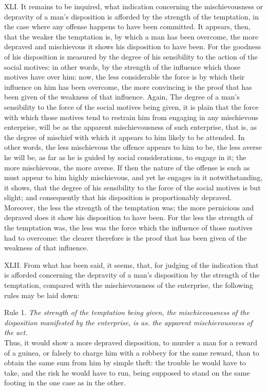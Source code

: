 \documentclass[12pt]{report}
\begin{document}
XLI. It remains to be inquired, what indication concerning the
mischievousness or depravity of a man's disposition is afforded by the
strength of the temptation, in the case where any offense happens to
have been committed. It appears, then, that the weaker the temptation
is, by which a man has been overcome, the more depraved and mischievous
it shows his disposition to have been. For the goodness of his
disposition is measured by the degree of his sensibility to the action
of the social motives: in other words, by the strength of the influence
which those motives have over him: now, the less considerable the force
is by which their influence on him has been overcome, the more
convincing is the proof that has been given of the weakness of that
influence. Again, The degree of a man's sensibility to the force of the
social motives being given, it is plain that the force with which those
motives tend to restrain him from engaging in any mischievous
enterprise, will be as the apparent mischievousness of such enterprise,
that is, as the degree of mischief with which it appears to him likely
to be attended. In other words, the less mischievous the offence appears
to him to be, the less averse he will be, as far as he is guided by
social considerations, to engage in it; the more mischievous, the more
averse. If then the nature of the offense is such as must appear to him
highly mischievous, and yet he engages in it notwithstanding, it shows,
that the degree of his sensibility to the force of the social motives is
but slight; and consequently that his disposition is proportionably
depraved. Moreover, the less the strength of the temptation was; the
more pernicious and depraved does it show his disposition to have been.
For the less the strength of the temptation was, the less was the force
which the influence of those motives had to overcome: the clearer
therefore is the proof that has been given of the weakness of that
influence.

XLII. From what has been said, it seems, that, for judging of the
indication that is afforded concerning the depravity of a man's
disposition by the strength of the temptation, compared with the
mischievousness of the enterprise, the following rules may be laid down:

Rule 1. \emph{The strength of the temptation being given, the
mischievousness} \emph{of the disposition manifested by the enterprise,
is as. the apparent mischievousness of the act.}\\
Thus, it would show a more depraved disposition, to murder a man for a
reward of a guinea, or falsely to charge him with a robbery for the same
reward, than to obtain the same sum from him by simple theft: the
trouble he would have to take, and the risk he would have to run, being
supposed to stand on the same footing in the one case as in the other.
\end{document}
